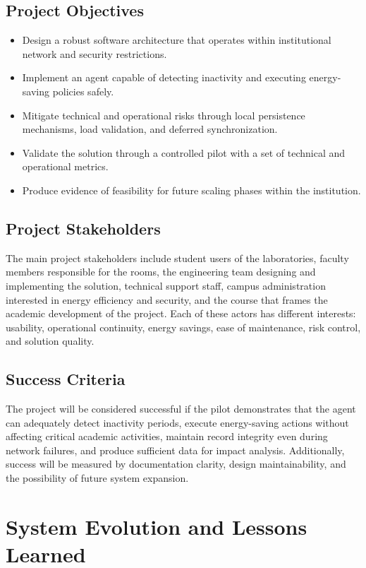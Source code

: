 \documentclass[12pt,a4paper]{article}
\begin{document}
\subsection{Project Objectives}
\begin{itemize}[leftmargin=1.2cm]
    \item Design a robust software architecture that operates within institutional network and security restrictions.
    \item Implement an agent capable of detecting inactivity and executing energy-saving policies safely.
    \item Mitigate technical and operational risks through local persistence mechanisms, load validation, and deferred synchronization.
    \item Validate the solution through a controlled pilot with a set of technical and operational metrics.
    \item Produce evidence of feasibility for future scaling phases within the institution.
\end{itemize}

\subsection{Project Stakeholders}
The main project stakeholders include student users of the laboratories, faculty members responsible for the rooms, the engineering team designing and implementing the solution, technical support staff, campus administration interested in energy efficiency and security, and the course that frames the academic development of the project. Each of these actors has different interests: usability, operational continuity, energy savings, ease of maintenance, risk control, and solution quality.

\subsection{Success Criteria}
The project will be considered successful if the pilot demonstrates that the agent can adequately detect inactivity periods, execute energy-saving actions without affecting critical academic activities, maintain record integrity even during network failures, and produce sufficient data for impact analysis. Additionally, success will be measured by documentation clarity, design maintainability, and the possibility of future system expansion.

\section{System Evolution and Lessons Learned}
\end{document}

